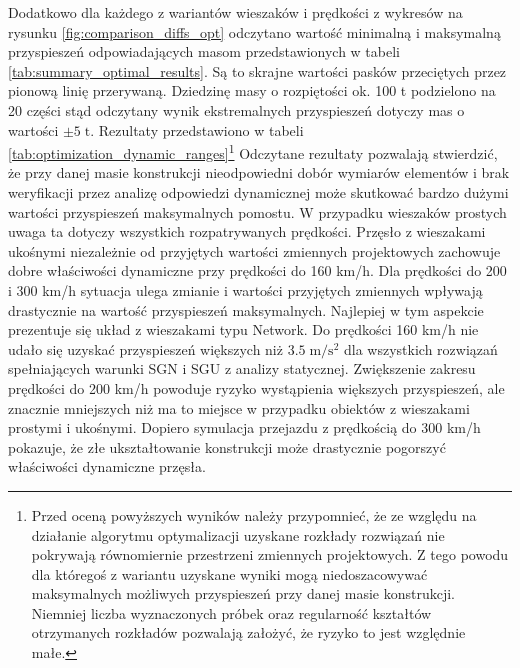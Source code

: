 Dodatkowo dla każdego z wariantów wieszaków i prędkości z wykresów na rysunku \ref{fig:comparison_diffs_opt} odczytano wartość minimalną i maksymalną przyspieszeń odpowiadających masom przedstawionych w tabeli \ref{tab:summary_optimal_results}. Są to skrajne wartości pasków przeciętych przez pionową linię przerywaną. Dziedzinę masy o rozpiętości ok. 100 t podzielono na 20 części stąd odczytany wynik ekstremalnych przyspieszeń dotyczy mas o wartości $\pm 5\;\mathrm{t}$. Rezultaty przedstawiono w tabeli \ref{tab:optimization_dynamic_ranges}\footnote{ 
		Przed oceną powyższych wyników należy przypomnieć, że ze względu na działanie algorytmu optymalizacji uzyskane rozkłady rozwiązań nie pokrywają równomiernie przestrzeni zmiennych projektowych. Z tego powodu dla któregoś z wariantu uzyskane wyniki mogą niedoszacowywać maksymalnych możliwych przyspieszeń przy danej masie konstrukcji. Niemniej liczba wyznaczonych próbek oraz regularność kształtów otrzymanych rozkładów pozwalają założyć, że ryzyko to jest względnie małe.}
Odczytane rezultaty pozwalają stwierdzić, że przy danej masie konstrukcji nieodpowiedni dobór wymiarów elementów i brak weryfikacji przez analizę odpowiedzi dynamicznej może skutkować bardzo dużymi wartości przyspieszeń maksymalnych pomostu. W przypadku wieszaków prostych uwaga ta dotyczy wszystkich rozpatrywanych prędkości. Przęsło z wieszakami ukośnymi niezależnie od przyjętych wartości zmiennych projektowych zachowuje dobre właściwości dynamiczne przy prędkości do 160 km/h. Dla prędkości do 200 i 300 km/h sytuacja ulega zmianie i wartości przyjętych zmiennych wpływają drastycznie na wartość przyspieszeń maksymalnych. Najlepiej w tym aspekcie prezentuje się układ z wieszakami typu Network. Do prędkości 160 km/h nie udało się uzyskać przyspieszeń większych niż $3.5\;\mathrm{m/s^2}$ dla wszystkich rozwiązań spełniających warunki SGN i SGU z analizy statycznej. Zwiększenie zakresu prędkości do 200 km/h powoduje ryzyko wystąpienia większych przyspieszeń, ale znacznie mniejszych niż ma to miejsce w przypadku obiektów z wieszakami prostymi i ukośnymi. Dopiero symulacja przejazdu z prędkością do 300 km/h pokazuje, że złe ukształtowanie konstrukcji może drastycznie pogorszyć właściwości dynamiczne przęsła.
	

